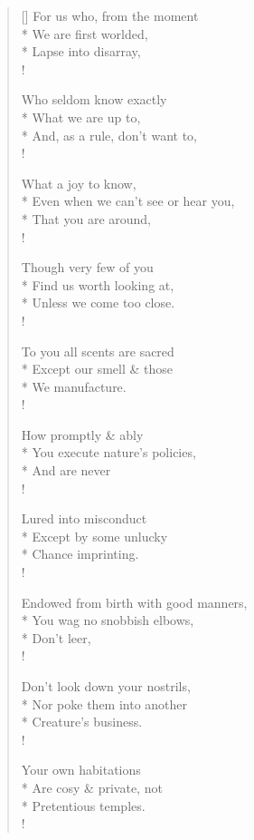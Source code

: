 \documentclass[MAIN]{subfiles}
\begin{document}
\settowidth{\versewidth}{For us who, from the moment}
\begin{verse}[\versewidth]
For us who, from the moment\\*
We are first worlded,\\*
Lapse into disarray,\\!

Who seldom know exactly\\*
What we are up to,\\*
And, as a rule, don't want to,\\!

What a joy to know,\\*
Even when we can't see or hear you,\\*
That you are around,\\!

Though very few of you\\*
Find us worth looking at,\\*
Unless we come too close.\\!

To you all scents are sacred\\*
Except our smell \& those\\*
We manufacture.\\!

How promptly \& ably\\*
You execute nature's policies,\\*
And are never\\!

Lured into misconduct\\*
Except by some unlucky\\*
Chance imprinting.\\!

Endowed from birth with good manners,\\*
You wag no snobbish elbows,\\*
Don't leer,\\!

Don't look down your nostrils,\\*
Nor poke them into another\\*
Creature's business.\\!

Your own habitations\\*
Are cosy \& private, not\\*
Pretentious temples.\\!


\end{verse}
\end{document}
